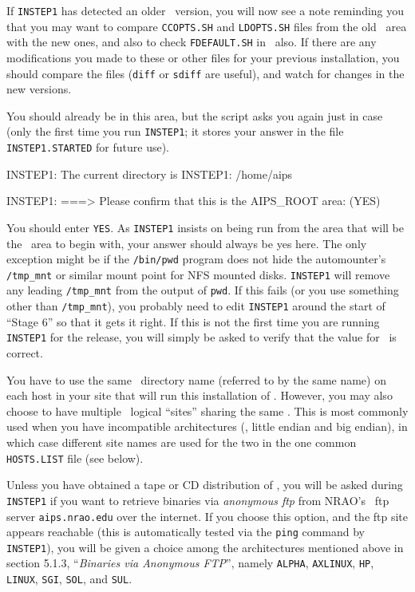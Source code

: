 If {\tt INSTEP1} has detected an older \AIPS\ version, you will now see
a note reminding you that you may want to compare {\tt CCOPTS.SH} and
{\tt LDOPTS.SH} files from the old \SYSL\ area with the new ones, and
also to check {\tt FDEFAULT.SH} in \SYSU\ also.  If there are any
modifications you made to these or other files for your previous
installation, you should compare the files ({\tt diff} or {\tt sdiff}
are useful), and watch for changes in the new versions.

\medskip{}

You should already be in this area, but the script asks you again just
in case (only the first time you run {\tt INSTEP1}; it stores your
answer in the file {\tt INSTEP1.STARTED} for future use). \medskip

\fortran
  INSTEP1: The current directory is
  INSTEP1:  /home/aips

  INSTEP1: ===> Please confirm that this is the AIPS_ROOT area: (YES)
\endfortran

\medskip
\noindent You should enter {\tt YES}.  As {\tt INSTEP1} insists on being
run from the area that will be the \AROOT\ area to begin with, your
answer should always be yes here.  The only exception might be if the
{\tt /bin/pwd} program does not hide the automounter's {\tt /tmp\_mnt}
or similar mount point for NFS mounted disks.  {\tt INSTEP1} will remove
any leading {\tt /tmp\_mnt} from the output of {\tt pwd}.  If this fails
(or you use something other than {\tt /tmp\_mnt}), you probably need to
edit {\tt INSTEP1} around the start of ``Stage 6'' so that it gets it
right.  If this is not the first time you are running {\tt INSTEP1} for
the {\tt \THISVER} release, you will simply be asked to verify that the
value for \AROOT\ is correct.

You have to use the same \AROOT\ directory name (referred to by the same
name) on each host in your site that will run this installation of
\AIPS.  However, you may also choose to have multiple \AIPS\ logical
``sites'' sharing the same \AROOT.  This is most commonly used when you
have incompatible architectures (\ie, little endian and big endian), in
which case different site names are used for the two in the one common
{\tt HOSTS.LIST} file (see below).

\medskip{}

Unless you have obtained a tape or CD distribution of \AIPS, you will be
asked during {\tt INSTEP1} if you want to retrieve binaries via {\it
anonymous ftp\/} from NRAO's \AIPS\ ftp server {\tt aips.nrao.edu} over
the internet.  If you choose this option, and the ftp site appears
reachable (this is automatically tested via the {\tt ping} command by
{\tt INSTEP1}), you will be given a choice among the architectures
mentioned above in section 5.1.3, ``{\it Binaries via Anonymous
FTP\/}'',
namely {\tt ALPHA}, {\tt AXLINUX}, {\tt HP}, {\tt LINUX},
{\tt SGI}, {\tt SOL}, and {\tt SUL}.

